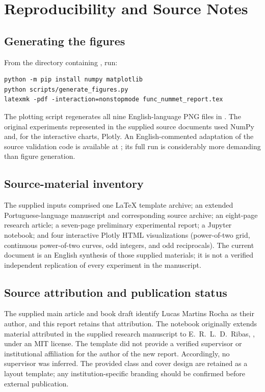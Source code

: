\chapter{Reproducibility and Source Notes}\label{app:rep}

\section{Generating the figures}
From the directory containing , run:
\begin{verbatim}
python -m pip install numpy matplotlib
python scripts/generate_figures.py
latexmk -pdf -interaction=nonstopmode func_nummet_report.tex
\end{verbatim}
The plotting script regenerates all nine English-language PNG files in . The original experiments represented in the supplied source documents used NumPy and, for the interactive charts, Plotly. An English-commented adaptation of the source validation code is available at ; its full run is considerably more demanding than figure generation.

\section{Source-material inventory}
The supplied inputs comprised one LaTeX template archive; an extended Portuguese-language manuscript and corresponding source archive; an eight-page research article; a seven-page preliminary experimental report; a Jupyter notebook; and four interactive Plotly HTML visualizations (power-of-two grid, continuous power-of-two curves, odd integers, and odd reciprocals). The current document is an English synthesis of those supplied materials; it is not a verified independent replication of every experiment in the manuscript.

\section{Source attribution and publication status}
The supplied main article and book draft identify Lucas Martins Rocha as their author, and this report retains that attribution. The notebook originally extends material attributed in the supplied research manuscript to E.~R.~L.~D.~Ribas, , under an MIT license. The template did not provide a verified supervisor or institutional affiliation for the author of the new report. Accordingly, no supervisor was inferred. The provided class and cover design are retained as a layout template; any institution-specific branding should be confirmed before external publication.

